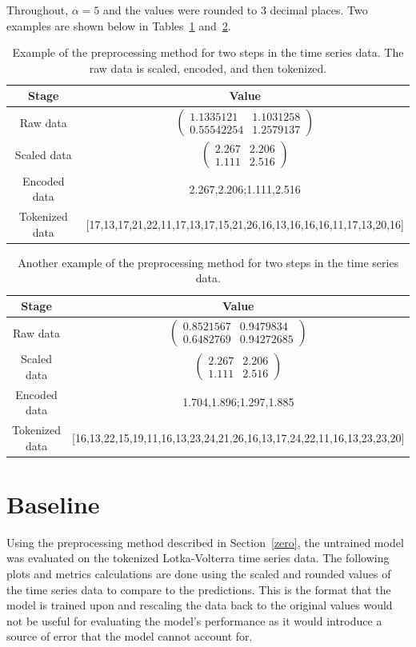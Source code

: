 \documentclass[11pt,a4paper]{article}
\begin{document}
Throughout, $\alpha=5$ and the values were rounded to 3 decimal places. Two examples are shown below in Tables~\ref{tab:example} and~\ref{tab:example2}.

\begin{table}
    \centering
    \begin{tabular}{c|c}
        Stage & Value \\
        \hline
        Raw data & $\begin{pmatrix} 1.1335121  & 1.1031258 \\ 0.55542254  & 1.2579137 \end{pmatrix}$ \\
        Scaled data & $\begin{pmatrix} 2.267 & 2.206 \\ 1.111 & 2.516 \end{pmatrix}$ \\
        Encoded data & 2.267,2.206;1.111,2.516 \\
        Tokenized data & [17,13,17,21,22,11,17,13,17,15,21,26,16,13,16,16,16,11,17,13,20,16]
    \end{tabular}
    \caption{Example of the preprocessing method for two steps in the time series data. The raw data is scaled, encoded, and then tokenized.}
    \label{tab:example}
\end{table}

\begin{table}
    \centering
    \begin{tabular}{c|c}
        Stage & Value \\
        \hline
        Raw data & $\begin{pmatrix} 0.8521567 & 0.9479834   \\ 0.6482769  & 0.94272685  \end{pmatrix}$ \\
        Scaled data & $\begin{pmatrix} 2.267 & 2.206 \\ 1.111 & 2.516 \end{pmatrix}$ \\
        Encoded data & 1.704,1.896;1.297,1.885 \\
        Tokenized data & [16,13,22,15,19,11,16,13,23,24,21,26,16,13,17,24,22,11,16,13,23,23,20]
    \end{tabular}
    \caption{Another example of the preprocessing method for two steps in the time series data.}
    \label{tab:example2}
\end{table}
\clearpage
\section{Baseline}
\label{sec:baseline}
Using the preprocessing method described in Section~\ref{zero}, the untrained model was evaluated on the tokenized Lotka-Volterra time series data. The following plots and metrics calculations are done using the scaled and rounded values of the time series data to compare to the predictions. This is the format that the model is trained upon and rescaling the data back to the original values would not be useful for evaluating the model's performance as it would introduce a source of error that the model cannot account for.
\end{document}
